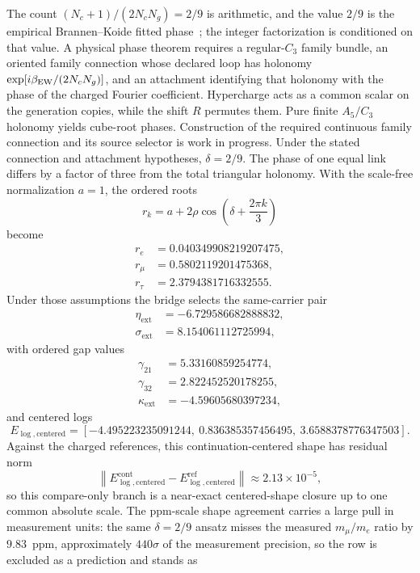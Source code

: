 \documentclass[11pt]{article}
\begin{document}
The count \((N_c+1)/(2N_cN_g)=2/9\) is arithmetic, and the value \(2/9\) is the
empirical Brannen--Koide fitted phase~\cite{koide1983,brannen2006}; the integer
factorization is conditioned on that value. A physical phase theorem requires a
regular-\(C_3\) family bundle, an oriented family connection
whose declared loop has holonomy
\(\exp[i\beta_{\rm EW}/(2N_cN_g)]\), and an attachment identifying that holonomy with the phase of
the charged Fourier coefficient. Hypercharge acts as a common scalar on the generation copies,
while the shift \(R\) permutes them. Pure finite \(A_5/C_3\) holonomy yields cube-root phases.
Construction of the required continuous family connection and its source selector is work in
progress. Under the stated connection and attachment hypotheses, \(\delta=2/9\). The phase of one
equal link differs by a factor of three from the total triangular holonomy.
With the scale-free normalization \(a=1\), the ordered roots
\[
r_k = a + 2\rho\cos\!\left(\delta + \frac{2\pi k}{3}\right)
\]
become
\[
\begin{aligned}
r_e&=0.040349908219207475,\\
r_\mu&=0.5802119201475368,\\
r_\tau&=2.3794381716332555.
\end{aligned}
\]
Under those assumptions the bridge selects the same-carrier pair
\[
\begin{aligned}
\eta_{\mathrm{ext}}&=-6.729586682888832,\\
\sigma_{\mathrm{ext}}&=8.154061112725994,
\end{aligned}
\]
with ordered gap values
\[
\begin{aligned}
\gamma_{21}&=5.33160859254774,\\
\gamma_{32}&=2.822452520178255,\\
\kappa_{\mathrm{ext}}&=-4.59605680397234,
\end{aligned}
\]
and centered logs
\[
E_{\log,\mathrm{centered}}
=
[-4.495223235091244,\ 0.836385357456495,\ 3.6588378776347503].
\]
Against the charged references, this continuation-centered shape has residual norm
\[
\left\|E_{\log,\mathrm{centered}}^{\mathrm{cont}}
-E_{\log,\mathrm{centered}}^{\mathrm{ref}}\right\|
\approx
2.13\times10^{-5},
\]
so this compare-only branch is a near-exact centered-shape closure up to one common absolute
scale. The ppm-scale shape agreement carries a large pull in measurement units: the same
\(\delta=2/9\) ansatz misses the measured \(m_\mu/m_e\) ratio by \(9.83\)~ppm, approximately
\(440\sigma\) of the measurement precision, so the row is excluded as a prediction and stands as
\end{document}
